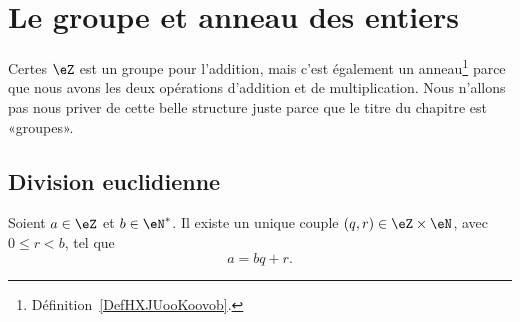 \section{Le groupe et anneau des entiers}

Certes \( \eZ\) est un groupe pour l'addition, mais c'est également un anneau\footnote{Définition~\ref{DefHXJUooKoovob}.} parce que nous avons les deux opérations d'addition et de multiplication. Nous n'allons pas nous priver de cette belle structure juste parce que le titre du chapitre est «groupes».

\subsection{Division euclidienne}

\begin{theorem}     \label{ThoDivisEuclide}
    Soient \( a\in\eZ\) et \( b\in\eN^*\). Il existe un unique couple \( (q,r)\in\eZ\times\eN\), avec \( 0\leq r<b\), tel que
    \begin{equation}
        a=bq+r.
    \end{equation}
\end{theorem}

